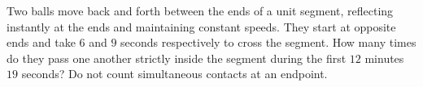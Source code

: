 Two balls move back and forth between the ends of a unit segment, reflecting instantly at the ends and maintaining constant speeds. They start at opposite ends and take $6$ and $9$ seconds respectively to cross the segment. How many times do they pass one another strictly inside the segment during the first $12$ minutes $19$ seconds? Do not count simultaneous contacts at an endpoint.
